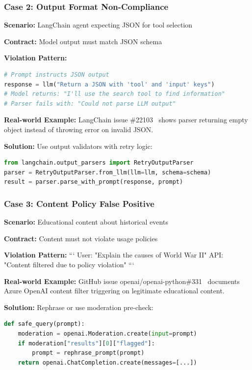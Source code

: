 \documentclass[11pt]{article}
\begin{document}
\subsubsection{Case 2: Output Format Non-Compliance}
\textbf{Scenario:} LangChain agent expecting JSON for tool selection

\textbf{Contract:} Model output must match JSON schema

\textbf{Violation Pattern:}
\begin{lstlisting}[language=Python]
# Prompt instructs JSON output
response = llm("Return a JSON with 'tool' and 'input' keys")
# Model returns: "I'll use the search tool to find information"
# Parser fails with: "Could not parse LLM output"
\end{lstlisting}

\textbf{Real-world Example:} LangChain issue \#22103~\cite{githublangchain22103} shows parser returning empty object instead of throwing error on invalid JSON.

\textbf{Solution:} Use output validators with retry logic:
\begin{lstlisting}[language=Python]
from langchain.output_parsers import RetryOutputParser
parser = RetryOutputParser.from_llm(llm=llm, schema=schema)
result = parser.parse_with_prompt(response, prompt)
\end{lstlisting}

\subsubsection{Case 3: Content Policy False Positive}
\textbf{Scenario:} Educational content about historical events

\textbf{Contract:} Content must not violate usage policies

\textbf{Violation Pattern:}
```
User: "Explain the causes of World War II"
API: "Content filtered due to policy violation"
```

\textbf{Real-world Example:} GitHub issue openai/openai-python\#331~\cite{githubopenai331} documents Azure OpenAI content filter triggering on legitimate educational content.

\textbf{Solution:} Rephrase or use moderation pre-check:
\begin{lstlisting}[language=Python]
def safe_query(prompt):
    moderation = openai.Moderation.create(input=prompt)
    if moderation["results"][0]["flagged"]:
        prompt = rephrase_prompt(prompt)
    return openai.ChatCompletion.create(messages=[...])
\end{lstlisting}
\end{document}
